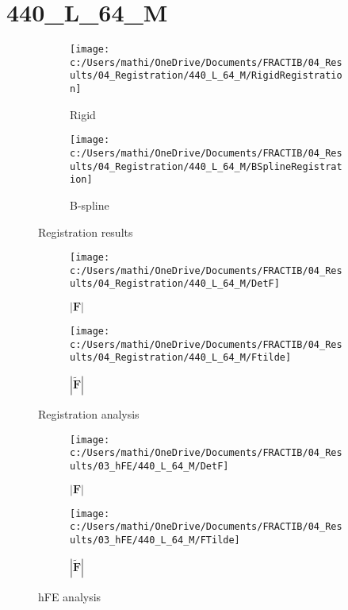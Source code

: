 \documentclass{article}%
\begin{document}
%
\newpage%
\section*{440\_L\_64\_M}%
\label{sec:440L64M}%


\begin{figure}[h!]%
\begin{subfigure}[b]{0.5\linewidth}%
\texttt{[image: c:/Users/mathi/OneDrive/Documents/FRACTIB/04\_Results/04\_Registration/440\_L\_64\_M/RigidRegistration]}%
\caption{Rigid}%
\end{subfigure}%
\begin{subfigure}[b]{0.5\linewidth}%
\texttt{[image: c:/Users/mathi/OneDrive/Documents/FRACTIB/04\_Results/04\_Registration/440\_L\_64\_M/BSplineRegistration]}%
\caption{B{-}spline}%
\end{subfigure}%
\caption{Registration results}%
\end{figure}

%


\begin{figure}[h!]%
\begin{subfigure}[b]{0.5\linewidth}%
\texttt{[image: c:/Users/mathi/OneDrive/Documents/FRACTIB/04\_Results/04\_Registration/440\_L\_64\_M/DetF]}%
\caption{$|\mathbf{F}|$}%
\end{subfigure}%
\begin{subfigure}[b]{0.5\linewidth}%
\texttt{[image: c:/Users/mathi/OneDrive/Documents/FRACTIB/04\_Results/04\_Registration/440\_L\_64\_M/Ftilde]}%
\caption{$|\widetilde{\mathbf{F}}|$}%
\end{subfigure}%
\caption{Registration analysis}%
\end{figure}

%


\begin{figure}[h!]%
\begin{subfigure}[b]{0.5\linewidth}%
\texttt{[image: c:/Users/mathi/OneDrive/Documents/FRACTIB/04\_Results/03\_hFE/440\_L\_64\_M/DetF]}%
\caption{$|\mathbf{F}|$}%
\end{subfigure}%
\begin{subfigure}[b]{0.5\linewidth}%
\texttt{[image: c:/Users/mathi/OneDrive/Documents/FRACTIB/04\_Results/03\_hFE/440\_L\_64\_M/FTilde]}%
\caption{$|\widetilde{\mathbf{F}}|$}%
\end{subfigure}%
\caption{hFE analysis}%
\end{figure}
\end{document}

